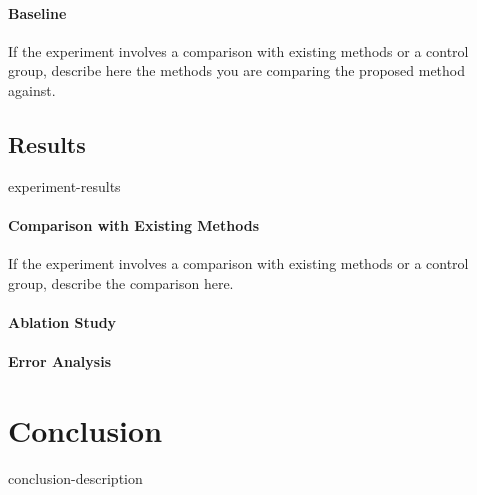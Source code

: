 \documentclass{article}
\begin{document}
\paragraph{Baseline}
If the experiment involves a comparison with existing methods or a control group, describe here the methods you are comparing the proposed method against.

\subsection{Results}
{experiment-results}

\paragraph{Comparison with Existing Methods}
If the experiment involves a comparison with existing methods or a control group, describe the comparison here.

\paragraph{Ablation Study}

\paragraph{Error Analysis}

\section{Conclusion}
{conclusion-description}
\end{document}
